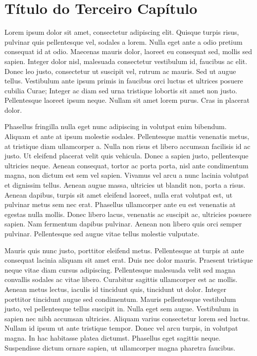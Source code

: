 \chapter{Título do Terceiro Capítulo}
\label{cap:titulo do terceiro capitulo}

Lorem ipsum dolor sit amet, consectetur adipiscing elit. Quisque turpis risus, pulvinar quis pellentesque vel, sodales a lorem. Nulla eget ante a odio pretium consequat id at odio. Maecenas mauris dolor, laoreet eu consequat sed, mollis sed sapien. Integer dolor nisl, malesuada consectetur vestibulum id, faucibus ac elit. Donec leo justo, consectetur ut suscipit vel, rutrum ac mauris. Sed ut augue tellus. Vestibulum ante ipsum primis in faucibus orci luctus et ultrices posuere cubilia Curae; Integer ac diam sed urna tristique lobortis sit amet non justo. Pellentesque laoreet ipsum neque. Nullam sit amet lorem purus. Cras in placerat dolor.

Phasellus fringilla nulla eget nunc adipiscing in volutpat enim bibendum. Aliquam et ante at ipsum molestie sodales. Pellentesque mattis venenatis metus, at tristique diam ullamcorper a. Nulla non risus et libero accumsan facilisis id ac justo. Ut eleifend placerat velit quis vehicula. Donec a sapien justo, pellentesque ultricies neque. Aenean consequat, tortor ac porta porta, nisl ante condimentum magna, non dictum est sem vel sapien. Vivamus vel arcu a nunc lacinia volutpat et dignissim tellus. Aenean augue massa, ultricies ut blandit non, porta a risus. Aenean dapibus, turpis sit amet eleifend laoreet, nulla erat volutpat est, ut pulvinar metus sem nec erat. Phasellus ullamcorper ante eu est venenatis at egestas nulla mollis. Donec libero lacus, venenatis ac suscipit ac, ultricies posuere sapien. Nam fermentum dapibus pulvinar. Aenean non libero quis orci semper pulvinar. Pellentesque sed augue vitae tellus molestie vulputate.

Mauris quis nunc justo, porttitor eleifend metus. Pellentesque at turpis at ante consequat lacinia aliquam sit amet erat. Duis nec dolor mauris. Praesent tristique neque vitae diam cursus adipiscing. Pellentesque malesuada velit sed magna convallis sodales ac vitae libero. Curabitur sagittis ullamcorper est ac mollis. Aenean metus lectus, iaculis id tincidunt quis, tincidunt ut dolor. Integer porttitor tincidunt augue sed condimentum. Mauris pellentesque vestibulum justo, vel pellentesque tellus suscipit in. Nulla eget sem augue. Vestibulum in sapien nec nibh accumsan ultricies. Aliquam varius consectetur lorem sed luctus. Nullam id ipsum ut ante tristique tempor. Donec vel arcu turpis, in volutpat magna. In hac habitasse platea dictumst. Phasellus eget sagittis neque. Suspendisse dictum ornare sapien, ut ullamcorper magna pharetra faucibus.


